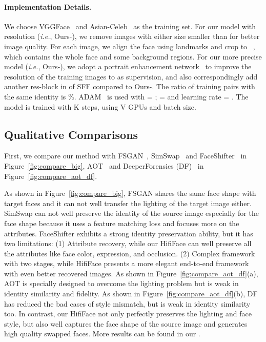 \documentclass{article}
\begin{document}
\paragraph{Implementation Details.} 
We choose VGGFace~\cite{cao2018vggface2} and Asian-Celeb~\cite{DeepGlint} as the training set. 
For our model with resolution  (\textit{i.e.}, Ours-), we remove images with either size smaller than  for better image quality. 
For each image, we align the face using  landmarks and crop to ~\cite{li2019faceshifter}, which contains the whole face and some background regions. 
For our more precise model (\textit{i.e.}, Ours-), we adopt a portrait enhancement network~\cite{li2020blind} to improve the resolution of the training images to  as supervision, and also correspondingly add another res-block in  of SFF compared to Ours-. 
The ratio of training pairs with the same identity is \%. ADAM~\cite{kingma2014adam} is used with  = ;  =  and learning rate = . 
The model is trained with K steps, using  V GPUs and  batch size. 



\subsection{Qualitative Comparisons}
First, we compare our method with FSGAN~\cite{Nirkin2019fsgan}, SimSwap~\cite{chen2020simswap} and FaceShifter~\cite{li2019faceshifter} in Figure~\ref{fig:compare_big},  AOT~\cite{zhu2020aot} and DeeperForensics (DF)~\cite{jiang2020deeperforensics} in Figure~\ref{fig:compare_aot_df}. 


As shown in Figure~\ref{fig:compare_big}, FSGAN shares the same face shape with target faces and it can not well transfer the lighting of the target image either.
SimSwap can not well preserve the identity of the source image especially for the face shape because it uses a feature matching loss and focuses more on the attributes. 
FaceShifter exhibits a strong identity preservation ability,
but it has two limitations: (1) Attribute recovery, while our HifiFace can well preserve all the attributes like face color, expression, and occlusion. (2) Complex framework with two stages, while HifiFace presents a more elegant end-to-end framework with even better recovered images. 
As shown in Figure~\ref{fig:compare_aot_df}(a), AOT is specially designed to overcome the lighting problem but is weak in identity similarity and fidelity.  As shown in Figure~\ref{fig:compare_aot_df}(b), DF has reduced the bad cases of style mismatch, but is weak in identity similarity too.
In contrast, our HifiFace not only perfectly preserves the lighting and face style, but also well captures the face shape of the source image and generates high quality swapped faces.
More results can be found in our .
\end{document}
